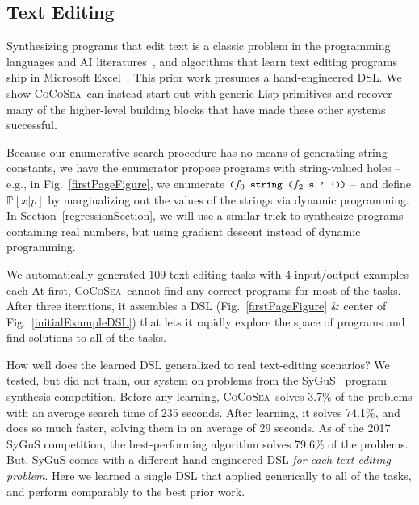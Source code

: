 \documentclass{article}
\newcommand{\system}{\textsc{CoCoSea}~}
\newcommand{\code}[1]{{\footnotesize\texttt{#1}}}
\newcommand{\probability}{\mathds{P}} %
\begin{document}

\subsection{Text Editing}\label{textSection}
Synthesizing programs that edit text is a classic problem in the
programming languages and AI literatures~\cite{menon2013machine,lau2001programming},
and algorithms that learn text editing programs ship in Microsoft Excel~\cite{gulwani2011automating}.
This prior work presumes a hand-engineered DSL.
We show \system can instead start out with generic Lisp primitives
and recover many of the higher-level building blocks that have made these
other systems successful.

Because our enumerative search procedure has no means of generating
string constants, we have the enumerator propose programs with string-valued holes --
e.g., in Fig.~\ref{firstPageFigure},
we enumerate $\text{\code{(}}f_0\code{ string (}f_2\text{\code{ s ' '))}}$ --
and define $\probability[x|p]$ by marginalizing out the values of the
strings via dynamic programming.  In Section~\ref{regressionSection},
we will use a similar trick to synthesize programs containing real
numbers, but using gradient descent instead of dynamic programming.

We automatically generated 109 text editing tasks with 4 input/output examples each
At first, \system cannot find any correct programs for most of the tasks.
After three iterations, it assembles a DSL (Fig.~\ref{firstPageFigure} \& center of Fig.~\ref{initialExampleDSL}) that lets it rapidly explore the space of programs and find solutions to
all of the tasks.

How well does the  learned DSL generalized to real text-editing scenarios?
We tested, but did not train, our system on problems from the SyGuS~\cite{alur2016sygus} program synthesis competition. Before any learning,
\system solves 3.7\% of the problems with an average search time of 235 seconds.
After learning,
it solves 74.1\%, and does so much faster,
solving them in an average of 29 seconds.
As of the 2017 SyGuS competition,
the best-performing algorithm solves 79.6\% of the problems.
But, SyGuS comes with a
different hand-engineered DSL \emph{for each text editing problem}.
Here  we learned a single DSL
that applied generically to
all of the tasks,
and perform comparably to the best
prior work.
\end{document}
